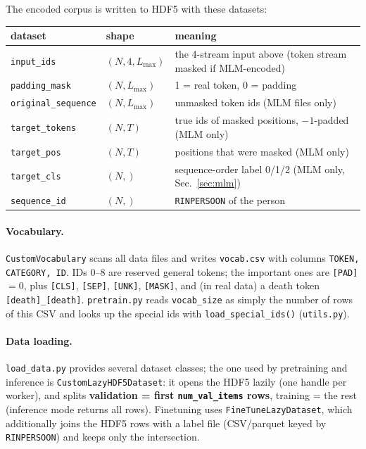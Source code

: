 \documentclass[11pt,a4paper]{article}
\newcommand{\file}[1]{\texttt{\small #1}}
\newcommand{\code}[1]{\texttt{\small #1}}
\begin{document}
\noindent The encoded corpus is written to HDF5 with these datasets:
\begin{center}\small
\begin{tabular}{@{}llp{8.2cm}@{}}
\toprule
\textbf{dataset} & \textbf{shape} & \textbf{meaning} \\
\midrule
\code{input\_ids}         & $(N,4,L_{\max})$ & the 4-stream input above (token stream masked if MLM-encoded) \\
\code{padding\_mask}      & $(N,L_{\max})$   & 1 = real token, 0 = padding \\
\code{original\_sequence} & $(N,L_{\max})$   & unmasked token ids (MLM files only) \\
\code{target\_tokens}     & $(N,T)$          & true ids of masked positions, $-1$-padded (MLM only) \\
\code{target\_pos}        & $(N,T)$          & positions that were masked (MLM only) \\
\code{target\_cls}        & $(N,)$           & sequence-order label 0/1/2 (MLM only, Sec.~\ref{sec:mlm}) \\
\code{sequence\_id}       & $(N,)$           & \code{RINPERSOON} of the person \\
\bottomrule
\end{tabular}
\end{center}

\paragraph{Vocabulary.} \code{CustomVocabulary} scans all data files and writes
\code{vocab.csv} with columns \code{TOKEN, CATEGORY, ID}. IDs $0$--$8$ are
reserved general tokens; the important ones are \code{[PAD]}$=0$, plus
\code{[CLS]}, \code{[SEP]}, \code{[UNK]}, \code{[MASK]}, and (in real data) a
death token \code{[death]\_[death]}. \file{pretrain.py} reads
\code{vocab\_size} as simply the number of rows of this CSV and looks up the
special ids with \code{load\_special\_ids()} (\file{utils.py}).

\paragraph{Data loading.} \file{load\_data.py} provides several dataset classes;
the one used by pretraining and inference is \code{CustomLazyHDF5Dataset}: it
opens the HDF5 lazily (one handle per worker), and splits
\textbf{validation = first \code{num\_val\_items} rows}, training = the rest
(inference mode returns all rows). Finetuning uses \code{FineTuneLazyDataset},
which additionally joins the HDF5 rows with a label file (CSV/parquet keyed by
\code{RINPERSOON}) and keeps only the intersection.
\end{document}
